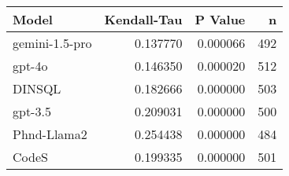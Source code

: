 \begin{tabular}{lrrr}
\toprule
Model & Kendall-Tau & P Value & n \\
\midrule
gemini-1.5-pro & 0.137770 & 0.000066 & 492 \\
gpt-4o & 0.146350 & 0.000020 & 512 \\
DINSQL & 0.182666 & 0.000000 & 503 \\
gpt-3.5 & 0.209031 & 0.000000 & 500 \\
Phnd-Llama2 & 0.254438 & 0.000000 & 484 \\
CodeS & 0.199335 & 0.000000 & 501 \\
\bottomrule
\end{tabular}
